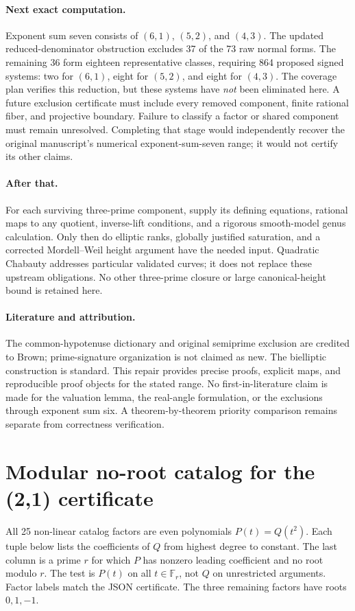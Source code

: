\documentclass[11pt]{article}
\theoremstyle{definition}\newtheorem{definition}[theorem]{Definition}
\theoremstyle{remark}\newtheorem{remark}[theorem]{Remark}
\begin{document}
\paragraph{Next exact computation.}
Exponent sum seven consists of $(6,1)$, $(5,2)$, and $(4,3)$. The updated reduced-denominator obstruction excludes 37 of the 73 raw normal forms. The remaining 36 form eighteen representative classes, requiring 864 proposed signed systems: two for $(6,1)$, eight for $(5,2)$, and eight for $(4,3)$. The coverage plan  verifies this reduction, but these systems have \emph{not} been eliminated here. A future exclusion certificate must include every removed component, finite rational fiber, and projective boundary. Failure to classify a factor or shared component must remain unresolved. Completing that stage would independently recover the original manuscript's numerical exponent-sum-seven range; it would not certify its other claims.

\paragraph{After that.}
For each surviving three-prime component, supply its defining equations, rational maps to any quotient, inverse-lift conditions, and a rigorous smooth-model genus calculation. Only then do elliptic ranks, globally justified saturation, and a corrected Mordell--Weil height argument have the needed input. Quadratic Chabauty addresses particular validated curves; it does not replace these upstream obligations. No other three-prime closure or large canonical-height bound is retained here.

\paragraph{Literature and attribution.}
The common-hypotenuse dictionary and original semiprime exclusion are credited to Brown; prime-signature organization is not claimed as new. The bielliptic construction is standard. This repair provides precise proofs, explicit maps, and reproducible proof objects for the stated range. No first-in-literature claim is made for the valuation lemma, the real-angle formulation, or the exclusions through exponent sum six. A theorem-by-theorem priority comparison remains separate from correctness verification.

\appendix
\section{Modular no-root catalog for the (2,1) certificate}\label{app:factors}
All 25 non-linear catalog factors are even polynomials $P(t)=Q(t^2)$. Each tuple below lists the coefficients of $Q$ from highest degree to constant. The last column is a prime $r$ for which $P$ has nonzero leading coefficient and no root modulo $r$. The test is $P(t)$ on all $t\in\mathbb F_r$, not $Q$ on unrestricted arguments. Factor labels match the JSON certificate. The three remaining factors have roots $0,1,-1$.
\end{document}
